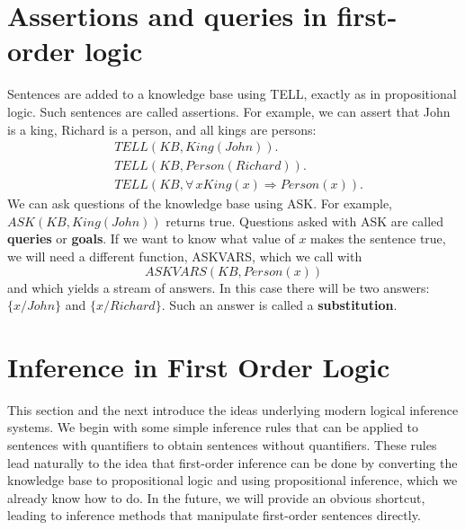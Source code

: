 \section{Assertions and queries in first-order logic}
Sentences are added to a knowledge base using TELL, exactly as in propositional logic. Such sentences are called assertions. For example, we can assert that John is a king, Richard is a person, and all kings are persons:
\[\begin{split}
    & TELL(KB, King(John)) .\\
    & TELL(KB, Person(Richard)) .\\
    & TELL(KB, \forall \, x King(x) \Rightarrow Person(x)) .
\end{split}\]
We can ask questions of the knowledge base using ASK. For example, $ASK(KB, King(John))$ returns true. Questions asked with ASK are called \textbf{queries} or \textbf{goals}.\newline\newline
If we want to know what value of $x$ makes the sentence true, we will need a different function, ASKVARS, which we call with
\[ASKVARS(KB,Person(x))\]
and which yields a stream of answers. In this case there will be two answers: $\{x/John\}$ and $\{x/Richard\}$. Such an answer is called a \textbf{substitution}.

\section{Inference in First Order Logic}
This section and the next introduce the ideas underlying modern logical inference systems. We begin with some simple inference rules that can be applied to sentences with quantifiers to obtain sentences without quantifiers. These rules lead naturally to the idea that first-order inference can be done by converting the knowledge base to propositional logic and using propositional inference, which we already know how to do. In the future, we will provide an obvious shortcut, leading to inference methods that manipulate first-order sentences directly.

